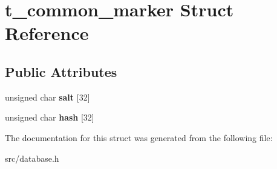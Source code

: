 \hypertarget{structt__common__marker}{}\section{t\+\_\+common\+\_\+marker Struct Reference}
\label{structt__common__marker}
\subsection*{Public Attributes}
\begin{DoxyCompactItemize}
\item 
\mbox{\label{structt__common__marker_ab3707f6e99f50cdc5618a212aa29b8ab}} 
unsigned char {\bfseries salt} \mbox{[}32\mbox{]}
\item 
\mbox{\label{structt__common__marker_a421907dde8f6c678f914d8fa78637fe9}} 
unsigned char {\bfseries hash} \mbox{[}32\mbox{]}
\end{DoxyCompactItemize}


The documentation for this struct was generated from the following file\+:\begin{DoxyCompactItemize}
\item 
src/database.\+h\end{DoxyCompactItemize}
